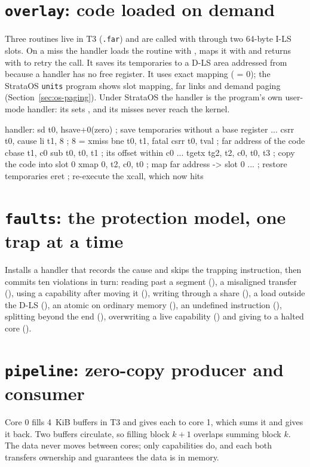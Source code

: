 \section{\texttt{overlay}: code loaded on demand}\label{sec:ex-overlay}
Three routines live in T3 (\texttt{.far}) and are called with  through two 64-byte I-LS
slots. On a miss the handler loads the routine with , maps it with  and returns
with  to retry the call. It saves its temporaries to a D-LS area addressed from 
because a handler has no free register. It uses exact mapping ( = 0); the StrataOS
\texttt{units} program shows slot mapping, far links and demand paging (Section~\ref{sec:os-paging}).
Under StrataOS the handler is the program's own user-mode handler: its  sets
, and its misses never reach the kernel.

\begin{asm}
handler:
        sd    t0, hsave+0(zero)         ; save temporaries without a base register
        ...
        csrr  t0, cause
        li    t1, 8                     ; 8 = xmiss
        bne   t0, t1, fatal
        csrr  t0, tval                  ; far address of the code
        cbase t1, c0
        sub   t0, t0, t1                ; its offset within c0
        ...
        tgetx tg2, t2, c0, t0, t3       ; copy the code into slot 0
        xmap  0, t2, c0, t0             ; map far address -> slot 0
        ...                             ; restore temporaries
        eret                            ; re-execute the xcall, which now hits
\end{asm}

\section{\texttt{faults}: the protection model, one trap at a time}\label{sec:ex-faults}
Installs a handler that records the cause and skips the trapping instruction, then commits ten
violations in turn: reading past a segment (), a misaligned transfer (),
using a capability after moving it (), writing through a share (), a load
outside the D-LS (), an atomic on ordinary memory (), an undefined instruction
(), splitting beyond the end (), overwriting a live capability
() and giving to a halted core ().

\section{\texttt{pipeline}: zero-copy producer and consumer}\label{sec:ex-pipeline}
Core 0 fills 4~KiB buffers in T3 and gives each to core 1, which sums it and gives it back. Two buffers
circulate, so filling block $k+1$ overlaps summing block $k$. The data never moves between cores;
only capabilities do, and each  both transfers ownership and guarantees the data is in
memory.

